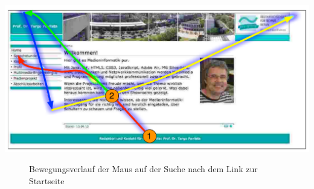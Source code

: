 \begin{center}
\includegraphics[scale=0.52]{./images/heatmapPavlista}
\end{center}
\begin{figure}[htb]
   \centering
   \caption{Bewegungsverlauf der Maus auf der Suche nach dem Link zur Startseite}
    \label{heatmapPavlista}
\end{figure}

